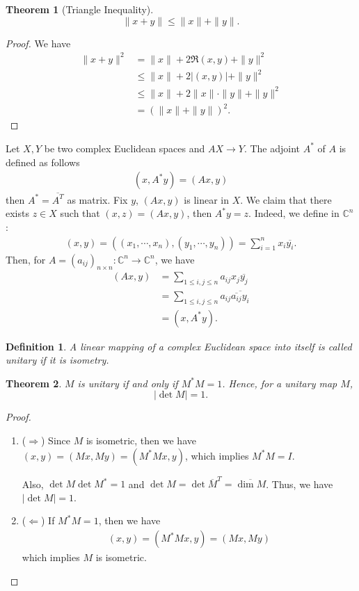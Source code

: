 \documentclass[11pt]{book}
\newtheorem{definition}{Definition}[section]
\newtheorem{theorem}{Theorem}[section]
\theoremstyle{definition}
\numberwithin{equation}{chapter}
\begin{document}
\medskip

\begin{theorem}[Triangle Inequality]
$$\|x+y\| \leq \|x\| + \|y\|.$$
\end{theorem}
\begin{proof}
We have
\begin{align*}
    \|x+y\|^2 & = \|x\| + 2 \Re(x,y) + \|y\|^2 \\
    & \leq \|x\| + 2\left|(x,y)\right| + \|y\|^2 \\
    & \leq \|x\| + 2 \|x\| \cdot \|y\| + \|y\|^2 \\
    & = (\|x\| + \|y\|)^2.
\end{align*}
\end{proof}

\medskip

Let $X, Y$ be two complex Euclidean spaces and $AX\to Y$. The adjoint $A^*$ of $A$ is defined as follows 
\begin{align*}
    (x, A^* y) = (Ax, y)
\end{align*}
then $A^* = \overline{A^T}$ as matrix. Fix $y$, $(Ax, y)$ is linear in $X$. We claim that there exists $z\in X$ such that $(x,z) = (Ax, y)$, then $A^* y = z$. Indeed, we define in $\mathbb{C}^n$:
\begin{align*}
    (x,y) = \left((x_1,\cdots,x_n), (y_1,\cdots,y_n)\right) = \sum^n_{i=1}x_i \overline{y_i}.
\end{align*}
Then, for $A = (a_{ij})_{n\times n}:\mathbb{C}^n \to \mathbb{C}^n$, we have
\begin{align*}
    (Ax, y) & = \sum_{1\leq i,j\leq n}a_{ij} x_j \overline{y_j} \\
    & = \sum_{1\leq i,j\leq n}a_{ij} \overline{\overline{a_{ij}} y_i} \\
    & = (x, A^* y).
\end{align*}

\medskip

\begin{definition}
A linear mapping of a complex Euclidean space into itself is called unitary if it is isometry.
\end{definition}

\medskip

\begin{theorem}
$M$ is unitary if and only if $M^*M = 1$. Hence, for a unitary map $M$, $$|\det M| = 1.$$
\end{theorem}
\begin{proof}
~\begin{enumerate}[label=(\arabic*)]
    \item ($\Rightarrow$) Since $M$ is isometric, then we have $(x,y) = (Mx, My) = (M^* M x, y)$, which implies $M^* M = I$.
    
    Also, $\det M \det M^* = 1$ and $\det M = \det \overline{M}^T = \overline{\dim M}$. Thus, we have $|\det M| = 1$.
    \item ($\Leftarrow$) If $M^*M = 1$, then we have
    \begin{align*}
        (x,y) = (M^* M x, y) = (Mx, My)
    \end{align*}
    which implies $M$ is isometric.
\end{enumerate}
\end{proof}
\end{document}

